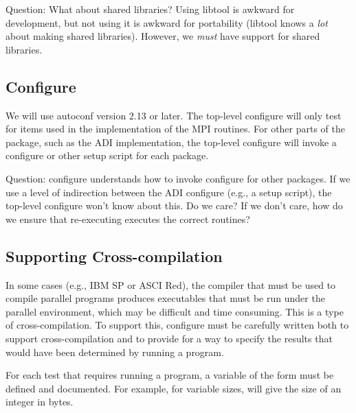 \documentclass{article}
\begin{document}
Question: What about shared libraries?  Using libtool is awkward for
development, but not using it is awkward for portability (libtool
knows a \emph{lot} about making shared libraries).  However, we
\emph{must} have support for shared libraries.

\subsection{Configure}
We will use autoconf version 2.13 or later.  The top-level configure will only
test for items used in the implementation of the MPI routines.  For
other parts of the package, such as the ADI implementation, the
top-level configure will invoke a configure or other setup script for
each package.

Question: configure understands how to invoke configure for other
packages.  If we use a level of indirection between the ADI configure
(e.g., a setup script), the top-level configure won't know about
this.  Do we care?  If we don't care, how do we ensure that
re-executing  executes the correct routines?

\subsection{Supporting Cross-compilation}
In some cases (e.g., IBM SP or ASCI Red), the compiler that must be used to
compile parallel programs produces executables that must be run under
the parallel environment, which may be difficult and time consuming.
This is a type of cross-compilation.  To support this, configure must
be carefully written both to support cross-compilation and to provide
for a way to specify the results that would have been determined by
running a program.

For each test that requires running a program, a variable of the form
 must be defined and documented.  For example, for
variable sizes,  will give the size of an
integer in bytes.
\end{document}
